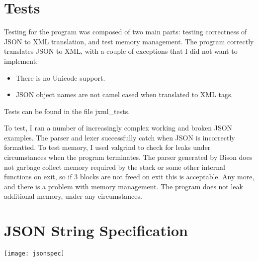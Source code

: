 \documentclass[12pt]{article}
\begin{document}
\section{Tests}
Testing for the program was composed of two main parts: testing
correctness of JSON to XML translation, and test memory management.
The program correctly translates JSON to XML, with a couple of
exceptions that I did not want to implement:
\begin{itemize}
\item There is no Unicode support.
\item JSON object names are not camel cased when translated to XML tags.
\end{itemize}
Tests can be found in the file jxml\_tests.\par
To test, I ran a number of increasingly complex working and broken
JSON examples.  The parser and lexer successfully catch when JSON is
incorrectly formatted. To test memory, I used valgrind to check for
leaks under circumstances when the program terminates.  The parser
generated by Bison does not garbage collect memory required by the
stack or some other internal functions on exit, so if 3 blocks are not
freed on exit this is acceptable.  Any more, and there is a problem
with memory management.  The program does not leak additional memory,
under any circumstances.
\pagebreak


\pagebreak
\appendix
\section{JSON String Specification}
\texttt{[image: jsonspec]}
\end{document}

